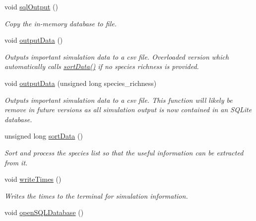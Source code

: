 \begin{DoxyCompactItemize}
void \hyperlink{class_tree_a8cd3db7add1884ea53b0d98002d39cd3}{sql\+Output} ()
\begin{DoxyCompactList}\small\item\em Copy the in-\/memory database to file. \end{DoxyCompactList}\item 
void \hyperlink{class_tree_afdf680e187c25ed39d1e66542ce44cc3}{output\+Data} ()\hypertarget{class_tree_afdf680e187c25ed39d1e66542ce44cc3}{}\label{class_tree_afdf680e187c25ed39d1e66542ce44cc3}

\begin{DoxyCompactList}\small\item\em Outputs important simulation data to a csv file. Overloaded version which automatically calls \hyperlink{class_tree_a2d2065bbebee8b55270d2691d40cd974}{sort\+Data()} if no species richness is provided. \end{DoxyCompactList}\item 
void \hyperlink{class_tree_a5acf7d0eea9ea2ef4928bb6691b87724}{output\+Data} (unsigned long species\+\_\+richness)
\begin{DoxyCompactList}\small\item\em Outputs important simulation data to a csv file. This function will likely be remove in future versions as all simulation output is now contained in an S\+Q\+Lite database. \end{DoxyCompactList}\item 
unsigned long \hyperlink{class_tree_a2d2065bbebee8b55270d2691d40cd974}{sort\+Data} ()\hypertarget{class_tree_a2d2065bbebee8b55270d2691d40cd974}{}\label{class_tree_a2d2065bbebee8b55270d2691d40cd974}

\begin{DoxyCompactList}\small\item\em Sort and process the species list so that the useful information can be extracted from it. \end{DoxyCompactList}\item 
void \hyperlink{class_tree_ab8785fc9e27868a56335048321c13290}{write\+Times} ()\hypertarget{class_tree_ab8785fc9e27868a56335048321c13290}{}\label{class_tree_ab8785fc9e27868a56335048321c13290}

\begin{DoxyCompactList}\small\item\em Writes the times to the terminal for simulation information. \end{DoxyCompactList}\item 
void \hyperlink{class_tree_a9e240bbfc3139b290a0dead741f560bf}{open\+S\+Q\+L\+Database} ()\hypertarget{class_tree_a9e240bbfc3139b290a0dead741f560bf}{}\label{class_tree_a9e240bbfc3139b290a0dead741f560bf}


\end{DoxyCompactItemize}
